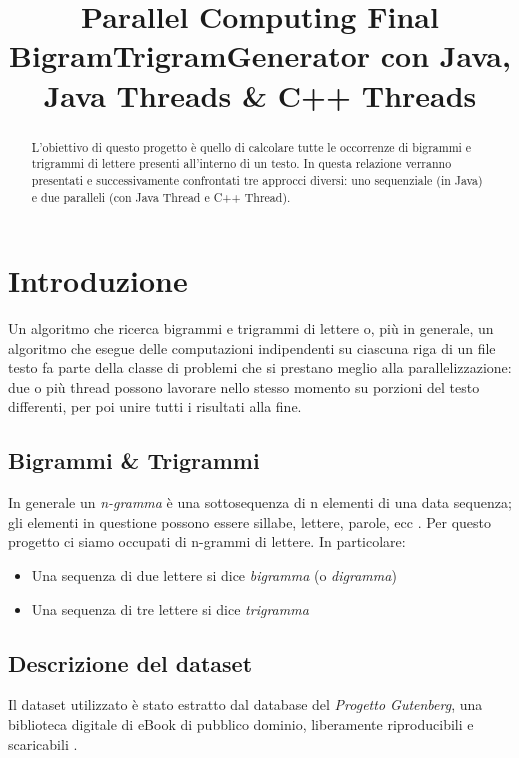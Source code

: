 \documentclass[10pt,twocolumn,letterpaper]{article}
\begin{document}
\title{Parallel Computing Final\\BigramTrigramGenerator con Java, Java Threads \& C++ Threads}

\maketitle
\thispagestyle{empty}

\begin{abstract}
L'obiettivo di questo progetto è quello di calcolare tutte le occorrenze di bigrammi e trigrammi di lettere presenti all'interno di un testo. In questa relazione verranno presentati e successivamente confrontati tre approcci diversi: uno sequenziale (in Java) e due paralleli (con Java Thread e C++ Thread).
\end{abstract}

\section{Introduzione}
Un algoritmo che ricerca bigrammi e trigrammi di lettere o, più in generale, un algoritmo che esegue delle computazioni indipendenti su ciascuna riga di un file testo fa parte della classe di problemi che si prestano meglio alla parallelizzazione: due o più thread possono lavorare nello stesso momento su porzioni del testo differenti, per poi unire tutti i risultati alla fine.
   
\subsection{Bigrammi \& Trigrammi}
In generale un \textit{n-gramma} è una sottosequenza di n elementi di una data sequenza; gli elementi in questione possono essere sillabe, lettere, parole, ecc \cite{N-GRAMMA}. Per questo progetto ci siamo occupati di n-grammi di lettere. In particolare:
\begin{itemize}
	\item Una sequenza di due lettere si dice \textit{bigramma} (o \textit{digramma})
	\item Una sequenza di tre lettere si dice \textit{trigramma}
\end{itemize}

\subsection{Descrizione del dataset}
Il dataset utilizzato è stato estratto dal database del \textit{Progetto Gutenberg}, una biblioteca digitale di eBook di pubblico dominio, liberamente riproducibili e scaricabili \cite{GUTENBERG}. 
\end{document}
